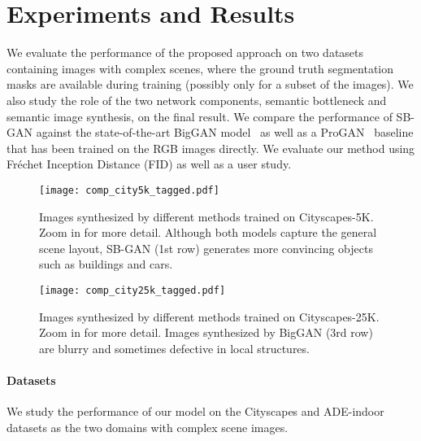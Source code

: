 \documentclass[10pt,twocolumn,letterpaper]{article}
\begin{document}
{\section{Experiments and Results}
We evaluate the performance of the proposed approach on two datasets containing images with complex scenes, where the ground truth segmentation masks are available during training (possibly only for a subset of the images). We also study the role of the two network components, semantic bottleneck and semantic image synthesis, on the final result. We compare the performance of SB-GAN against the state-of-the-art BigGAN model~\cite{biggan} as well as a ProGAN~\cite{PGGAN} baseline that has been trained on the RGB images directly. We evaluate our method using Fr\'echet Inception Distance (FID) as well as a user study.

\begin{figure*}[t!]
\centering
\texttt{[image: comp\_city5k\_tagged.pdf]}
\caption{Images synthesized by different methods trained on Cityscapes-5K. Zoom in for more detail. Although both models capture the general scene layout, SB-GAN (1st row) generates more convincing objects such as buildings and cars.}
\label{fig:city5k}
\end{figure*}

\begin{figure*}
\centering
\texttt{[image: comp\_city25k\_tagged.pdf]}
\caption{Images synthesized by different methods trained on Cityscapes-25K. Zoom in for more detail. Images synthesized by BigGAN (3rd row) are blurry and sometimes defective in local structures.}
\label{fig:city25k}
\end{figure*}

\vspace{-2mm}
\paragraph{Datasets} We study the performance of our model on the Cityscapes and ADE-indoor datasets as the two domains with complex scene images.

}
\end{document}
